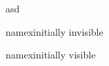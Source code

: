 \documentclass{article}
\begin{document}
asd

\begin{opt}{namex}initially invisible\end{opt}
 
\begin{OPT}{namex}initially visible\end{OPT}
\end{document}
